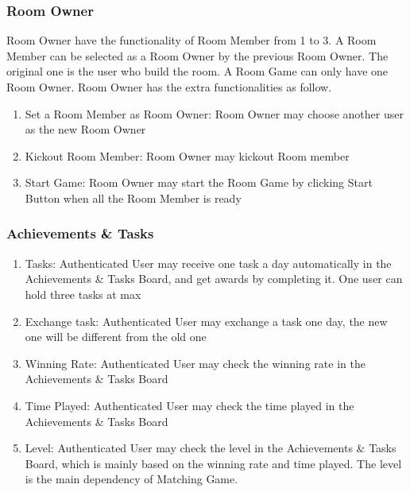 \documentclass[11pt]{article}
\begin{document}
\subsubsection{Room Owner}
Room Owner have the functionality of Room Member from 1 to 3. A Room Member can be selected as a Room Owner by the previous Room Owner. The original one is the user who build the room. A Room Game can only have one Room Owner. Room Owner has the extra functionalities as follow.
\begin{enumerate}
\item
Set a Room Member as Room Owner: Room Owner may choose another user as the new Room Owner
\item
Kickout Room Member: Room Owner may kickout Room member
\item
Start Game: Room Owner may start the Room Game by clicking Start Button when all the Room Member is ready
\end{enumerate}

\subsubsection{Achievements \& Tasks}
\begin{enumerate}
\item
Tasks: Authenticated User may receive one task a day automatically in the Achievements \& Tasks Board, and get awards by completing it. One user can hold three tasks at max
\item
Exchange task: Authenticated User may exchange a task one day, the new one will be different from the old one
\item
Winning Rate: Authenticated User may check the winning rate in the Achievements \& Tasks Board
\item
Time Played: Authenticated User may check the time played in the Achievements \& Tasks Board
\item
Level: Authenticated User may check the level in the Achievements \& Tasks Board, which is mainly based on the winning rate and time played. The level is the main dependency of Matching Game.
\end{enumerate}
\end{document}
